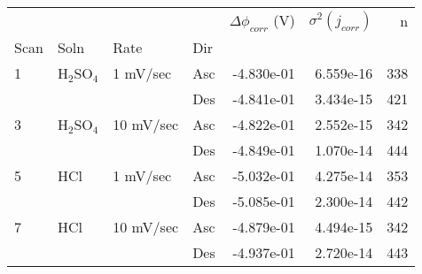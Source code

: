 \begin{tabular}{llllrrr}
\toprule
  &     &           &     &  $\Delta \phi_{corr}$ (V) &  $\sigma^2(j_{corr})$ &    n \\
Scan & Soln & Rate & Dir &                           &                       &      \\
\midrule
1 & H$_2$SO$_4$ & 1 mV/sec & Asc &                -4.830e-01 &             6.559e-16 &  338 \\
  &     &           & Des &                -4.841e-01 &             3.434e-15 &  421 \\
3 & H$_2$SO$_4$ & 10 mV/sec & Asc &                -4.822e-01 &             2.552e-15 &  342 \\
  &     &           & Des &                -4.849e-01 &             1.070e-14 &  444 \\
5 & HCl & 1 mV/sec & Asc &                -5.032e-01 &             4.275e-14 &  353 \\
  &     &           & Des &                -5.085e-01 &             2.300e-14 &  442 \\
7 & HCl & 10 mV/sec & Asc &                -4.879e-01 &             4.494e-15 &  342 \\
  &     &           & Des &                -4.937e-01 &             2.720e-14 &  443 \\
\bottomrule
\end{tabular}

